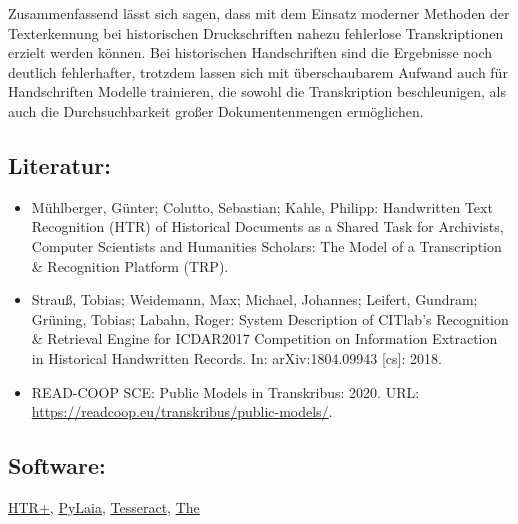 \documentclass{article}
\begin{document}
        Zusammenfassend lässt sich sagen, dass mit dem Einsatz moderner Methoden der
                  Texterkennung bei historischen Druckschriften nahezu fehlerlose Transkriptionen
                  erzielt werden können. Bei historischen Handschriften sind die Ergebnisse noch
                  deutlich fehlerhafter, trotzdem lassen sich mit überschaubarem Aufwand auch für
                  Handschriften Modelle trainieren, die sowohl die Transkription beschleunigen, als
                  auch die Durchsuchbarkeit großer Dokumentenmengen ermöglichen. \\
            
        \subsection*{Literatur:}\begin{itemize}\item Mühlberger, Günter; Colutto, Sebastian; Kahle, Philipp: Handwritten Text Recognition (HTR) of Historical
                              Documents as a Shared Task for Archivists, Computer Scientists and
                              Humanities Scholars: The Model of a Transcription & Recognition
                              Platform (TRP).\item Strauß, Tobias; Weidemann, Max; Michael, Johannes; Leifert, Gundram; Grüning, Tobias; Labahn, Roger: System Description of CITlab's Recognition &
                              Retrieval Engine for ICDAR2017 Competition on Information Extraction
                              in Historical Handwritten Records. In: arXiv:1804.09943 [cs]: 2018.\item READ-COOP SCE: Public Models in Transkribus: 2020. URL: \url{https://readcoop.eu/transkribus/public-models/}.\end{itemize}\subsection*{Software:}\href{https://readcoop.eu/wp-content/uploads/2018/12/D7.9_HTR_NN_final.pdf}{HTR+}, \href{https://github.com/jpuigcerver/PyLaia}{PyLaia}, \href{https://github.com/tesseract-ocr/}{Tesseract}, \href{https://github.com/tmbarchive/ocropy}{The
}
\end{document}
